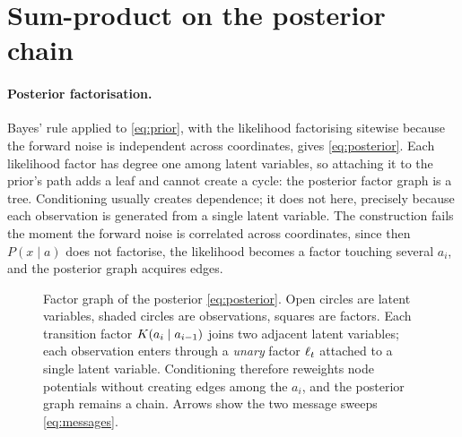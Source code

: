 \section{Sum-product on the posterior chain}
\label{app:bp}

\paragraph{Posterior factorisation.} Bayes' rule applied to \eqref{eq:prior}, with the likelihood
factorising sitewise because the forward noise is independent across coordinates, gives
\eqref{eq:posterior}. Each likelihood factor has degree one among latent variables, so attaching
it to the prior's path adds a leaf and cannot create a cycle: the posterior factor graph is a
tree. Conditioning usually creates dependence; it does not here, precisely because each
observation is generated from a single latent variable. The construction fails the moment the
forward noise is correlated across coordinates, since then $P(x\mid a)$ does not factorise, the
likelihood becomes a factor touching several $a_i$, and the posterior graph acquires edges.

\begin{figure}[!htbp]
\centering
{}
\caption{Factor graph of the posterior \eqref{eq:posterior}. Open circles are latent variables,
shaded circles are observations, squares are factors. Each transition factor
$K(a_i\mid a_{i-1})$ joins two adjacent latent variables; each observation enters through a
\emph{unary} factor $\ell_t$ attached to a single latent variable. Conditioning therefore reweights
node potentials without creating edges among the $a_i$, and the posterior graph remains a chain.
Arrows show the two message sweeps \eqref{eq:messages}.}
\label{fig:factorgraph}
\end{figure}

